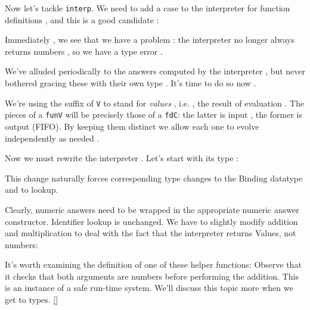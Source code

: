 Now let’s tackle  \verb|interp|. We need to add
a case to the interpreter for function definitions , and this is a good
candidate :

Immediately , we see that we have a problem : the interpreter no longer always returns numbers
, so we have a type error .

We’ve alluded periodically to the answers computed by the interpreter , but
never bothered gracing these with their own type . It’s time to do so now
.

We’re using the suffix of  \verb|V| to stand for
\emph{values}  , i.e. , the result
of evaluation . The pieces of a  \verb|funV|
will be precisely those of a  \verb|fdC|: the latter
is input , the former is output  (FIFO). By
keeping them distinct  we allow each one  to evolve independently  as needed
.

Now we must rewrite the interpreter .
Let’s start with its type :

This change naturally forces corresponding type changes to the Binding datatype
and to lookup.


Clearly, numeric answers need to be wrapped in the appropriate numeric answer
constructor. Identifier lookup is unchanged. We have to slightly modify addition
and multiplication to deal with the fact that the interpreter returns Values,
not numbers:

It’s worth examining the definition of one of these helper functions:
Observe that it checks that both arguments are numbers before performing the
addition. This is an instance of a safe run-time system. We’ll discuss this
topic more when we get to types. \ref{}

